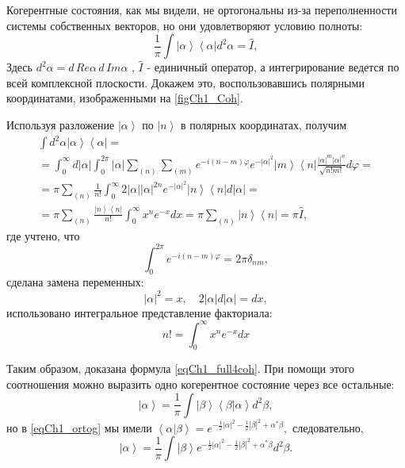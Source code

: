 Когерентные состояния, как мы видели, не ортогональны из-за
переполненности системы собственных векторов, но они удовлетворяют
условию полноты: 
\begin{equation}
\frac{1}{\pi}\int \left|\alpha\right>\left<\alpha\right| d^2 \alpha =
\hat{I},
\label{eqCh1_full4coh}
\end{equation}
Здесь $d^2 \alpha = d\, Re \alpha\, d\, Im \alpha$ , $\hat{I}$ - единичный
оператор, а интегрирование ведется по всей комплексной
плоскости. Докажем это, воспользовавшись полярными координатами,
изображенными на \autoref{figCh1_Coh}.  



Используя разложение $\left|\alpha\right>$ по $\left|n\right>$ в
полярных координатах, получим 
\begin{eqnarray}
\int d^2 \alpha \left|\alpha\right>\left<\alpha\right| =
\nonumber \\
=
\int_0^{\infty} d \left|\alpha\right|\int_0^{2
  \pi}\left|\alpha\right|\sum_{(n)}\sum_{(m)}e^{-i \left(n -
  m\right)\varphi}
e^{-\left|\alpha\right|^2}\left|m\right>\left<n\right|
\frac{\left|\alpha\right|^m \left|\alpha\right|^n}{\sqrt{n! m!}} d\varphi
= 
\nonumber \\
= \pi \sum_{(n)}\frac{1}{n!}\int_0^{\infty} 2
\left|\alpha\right|\left|\alpha\right|^{2n} e^{-\left|\alpha\right|^2} 
\left|n\right>\left<n\right|
d\left|\alpha\right| = 
\nonumber \\
=
\pi
\sum_{(n)}\frac{\left|n\right>\left<n\right|}{n!} \int_0^{\infty}x^n
e^{-x}dx = 
\pi \sum_{(n)}\left|n\right>\left<n\right| = \pi \hat{I},
\end{eqnarray}
где учтено, что
\[
\int_0^{2\pi} e^{-i \left(n - m\right)\varphi} = 2 \pi \delta_{nm},
\]
сделана замена переменных:  
\[
\left|\alpha\right|^2 = x, \quad 2 \left|\alpha\right| d
\left|\alpha\right| = d x,
\]
использовано интегральное представление факториала:
\[
n! = \int_0^{\infty}x^ne^{-x}dx
\]

Таким образом, доказана формула \eqref{eqCh1_full4coh}. При помощи
этого соотношения можно выразить одно когерентное состояние через все
остальные: 
\[
\left|\alpha\right> = \frac{1}{\pi}\int\left|\beta\right>\left<\beta\right|\left.\alpha\right> d^2 \beta,
\]
но в \eqref{eqCh1_ortog} мы имели
\(
\left<\alpha\right|\left.\beta\right> = 
e^{
-\frac{1}{2} \left|\alpha\right|^2  -\frac{1}{2} \left|\beta\right|^2
+
\alpha^{*} \beta
},
\)
следовательно,
\begin{equation}
\left|\alpha\right> = \frac{1}{\pi}\int\left|\beta\right>
e^{
-\frac{1}{2} \left|\alpha\right|^2  -\frac{1}{2} \left|\beta\right|^2
+
\alpha^{*} \beta
} d^2 \beta.
\end{equation}
